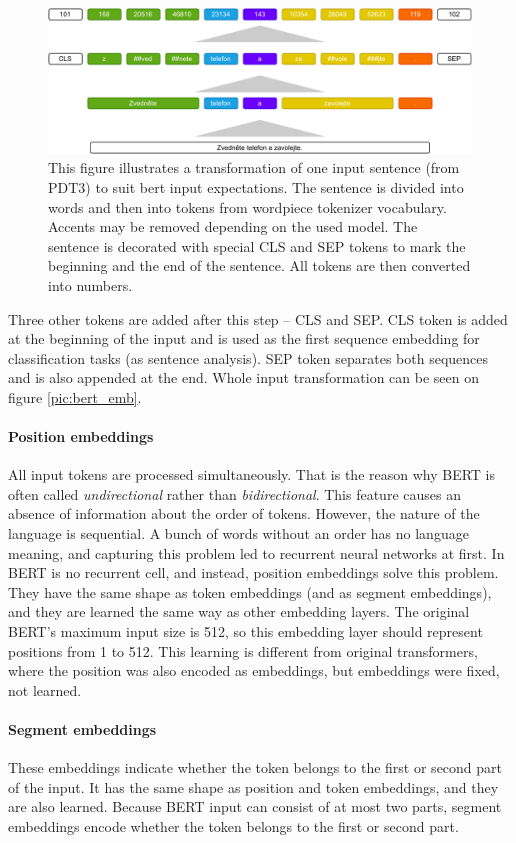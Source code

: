 \begin{figure}[ht]
\centering
\includegraphics[width=1\columnwidth]{../img/bert_input}
\protect\caption{This figure illustrates a transformation of one input sentence (from PDT3) to suit bert input expectations. The sentence is divided into words and then into tokens from wordpiece tokenizer vocabulary. Accents may be removed depending on the used model. The sentence is decorated with special CLS and SEP tokens to mark the beginning and the end of the sentence. All tokens are then converted into numbers. }
\label{pic:bert_inp}
\end{figure}
\par
Three other tokens are added after this step -- CLS and SEP. 
CLS token is added at the beginning of the input and is used as the first sequence embedding for classification tasks (as sentence analysis). SEP token separates both sequences and is also appended at the end. Whole input transformation can be seen on figure \ref{pic:bert_emb}.
\paragraph{Position embeddings}
All input tokens are processed simultaneously. That is the reason why BERT is often called \textit{undirectional} rather than \textit{bidirectional}. This feature causes an absence of information about the order of tokens. However, the nature of the language is sequential. A bunch of words without an order has no language meaning, and capturing this problem led to recurrent neural networks at first. In BERT is no recurrent cell, and instead, position embeddings solve this problem. They have the same shape as token embeddings (and as segment embeddings), and they are learned the same way as other embedding layers. The original BERT's maximum input size is 512, so this embedding layer should represent positions from 1 to 512. This learning is different from original transformers, where the position was also encoded as embeddings, but embeddings were fixed, not learned.
\paragraph{Segment embeddings}
These embeddings indicate whether the token belongs to the first or second part of the input. It has the same shape as position and token embeddings, and they are also learned. Because BERT input can consist of at most two parts, segment embeddings encode whether the token belongs to the first or second part.
